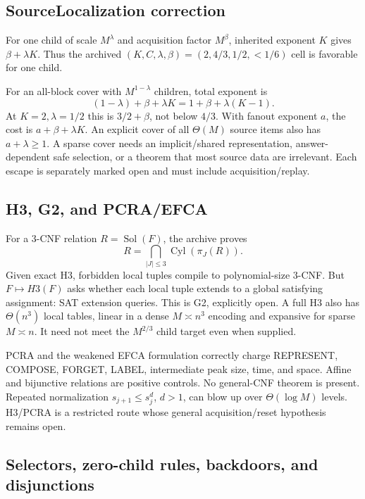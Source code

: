 \documentclass[11pt]{article}
\begin{document}
\subsection{SourceLocalization correction}

For one child of scale $M^\lambda$ and acquisition factor $M^\beta$, inherited exponent $K$ gives $\beta+\lambda K$.  Thus the archived $(K,C,\lambda,\beta)=(2,4/3,1/2,<1/6)$ cell is favorable for one child.

For an all-block cover with $M^{1-\lambda}$ children, total exponent is
\[
 (1-\lambda)+\beta+\lambda K=1+\beta+\lambda(K-1).
\]
At $K=2,\lambda=1/2$ this is $3/2+\beta$, not below $4/3$.  With fanout exponent $a$, the cost is $a+\beta+\lambda K$.  An explicit cover of all $\Theta(M)$ source items also has $a+\lambda\ge1$.  A sparse cover needs an implicit/shared representation, answer-dependent safe selection, or a theorem that most source data are irrelevant.  Each escape is separately marked open and must include acquisition/replay.

\subsection{H3, G2, and PCRA/EFCA}

For a 3-CNF relation $R=\operatorname{Sol}(F)$, the archive proves
\[
 R=\bigcap_{|J|\le3}\operatorname{Cyl}(\pi_J(R)).
\]
Given exact H3, forbidden local tuples compile to polynomial-size 3-CNF.  But $F\mapsto H3(F)$ asks whether each local tuple extends to a global satisfying assignment: SAT extension queries.  This is G2, explicitly open.  A full H3 also has $\Theta(n^3)$ local tables, linear in a dense $M\asymp n^3$ encoding and expansive for sparse $M\asymp n$.  It need not meet the $M^{2/3}$ child target even when supplied.

PCRA and the weakened EFCA formulation correctly charge REPRESENT, COMPOSE, FORGET, LABEL, intermediate peak size, time, and space.  Affine and bijunctive relations are positive controls.  No general-CNF theorem is present.  Repeated normalization $s_{j+1}\le s_j^d$, $d>1$, can blow up over $\Theta(\log M)$ levels.  H3/PCRA is a restricted route whose general acquisition/reset hypothesis remains open.

\subsection{Selectors, zero-child rules, backdoors, and disjunctions}
\end{document}
